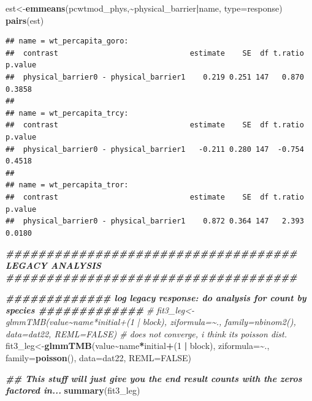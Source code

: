 \documentclass[
]{article}
\newenvironment{Shaded}{\begin{snugshade}}{\end{snugshade}}
\newcommand{\AttributeTok}[1]{\textcolor[rgb]{0.13,0.29,0.53}{#1}}
\newcommand{\CommentTok}[1]{\textcolor[rgb]{0.56,0.35,0.01}{\textit{#1}}}
\newcommand{\ConstantTok}[1]{\textcolor[rgb]{0.56,0.35,0.01}{#1}}
\newcommand{\DecValTok}[1]{\textcolor[rgb]{0.00,0.00,0.81}{#1}}
\newcommand{\DocumentationTok}[1]{\textcolor[rgb]{0.56,0.35,0.01}{\textbf{\textit{#1}}}}
\newcommand{\FunctionTok}[1]{\textcolor[rgb]{0.13,0.29,0.53}{\textbf{#1}}}
\newcommand{\NormalTok}[1]{#1}
\newcommand{\OtherTok}[1]{\textcolor[rgb]{0.56,0.35,0.01}{#1}}
\newcommand{\SpecialCharTok}[1]{\textcolor[rgb]{0.81,0.36,0.00}{\textbf{#1}}}
\newcommand{\StringTok}[1]{\textcolor[rgb]{0.31,0.60,0.02}{#1}}
\begin{document}
\begin{Shaded}
\begin{Highlighting}[]
\NormalTok{est}\OtherTok{\textless{}{-}}\FunctionTok{emmeans}\NormalTok{(pcwtmod\_phys,}\SpecialCharTok{\textasciitilde{}}\NormalTok{physical\_barrier}\SpecialCharTok{|}\NormalTok{name, }\AttributeTok{type=}\StringTok{\textquotesingle{}response\textquotesingle{}}\NormalTok{)}
\FunctionTok{pairs}\NormalTok{(est)}
\end{Highlighting}
\end{Shaded}

\begin{verbatim}
## name = wt_percapita_goro:
##  contrast                              estimate    SE  df t.ratio p.value
##  physical_barrier0 - physical_barrier1    0.219 0.251 147   0.870  0.3858
## 
## name = wt_percapita_trcy:
##  contrast                              estimate    SE  df t.ratio p.value
##  physical_barrier0 - physical_barrier1   -0.211 0.280 147  -0.754  0.4518
## 
## name = wt_percapita_tror:
##  contrast                              estimate    SE  df t.ratio p.value
##  physical_barrier0 - physical_barrier1    0.872 0.364 147   2.393  0.0180
\end{verbatim}

\begin{Shaded}
\begin{Highlighting}[]
\DocumentationTok{\#\#\#\#\#\#\#\#\#\#\#\#\#\#\#\#\#\#\#\#\#\#\#\#\#\#\#\#\#\#\#\#\#\#\#\# LEGACY ANALYSIS \#\#\#\#\#\#\#\#\#\#\#\#\#\#\#\#\#\#\#\#\#\#\#\#\#\#\#\#\#\#\#\#\#\#\#\#}

\DocumentationTok{\#\#\#\#\#\#\#\#\#\#\#\#\# log legacy response: do analysis for count by species \#\#\#\#\#\#\#\#\#\#\#\#\# }
\CommentTok{\# fit3\_leg\textless{}{-}glmmTMB(value\textasciitilde{}name*initial+(1 | block), ziformula=\textasciitilde{}., family=nbinom2(), data=dat22, REML=FALSE) \# does not converge, i think it\textquotesingle{}s poisson dist.}
\NormalTok{fit3\_leg}\OtherTok{\textless{}{-}}\FunctionTok{glmmTMB}\NormalTok{(value}\SpecialCharTok{\textasciitilde{}}\NormalTok{name}\SpecialCharTok{*}\NormalTok{initial}\SpecialCharTok{+}\NormalTok{(}\DecValTok{1} \SpecialCharTok{|}\NormalTok{ block), }\AttributeTok{ziformula=}\SpecialCharTok{\textasciitilde{}}\NormalTok{., }\AttributeTok{family=}\FunctionTok{poisson}\NormalTok{(), }\AttributeTok{data=}\NormalTok{dat22, }\AttributeTok{REML=}\ConstantTok{FALSE}\NormalTok{) }

\DocumentationTok{\#\# This stuff will just give you the end result counts with the zeros factored in...}
\FunctionTok{summary}\NormalTok{(fit3\_leg)}
\end{Highlighting}
\end{Shaded}
\end{document}
